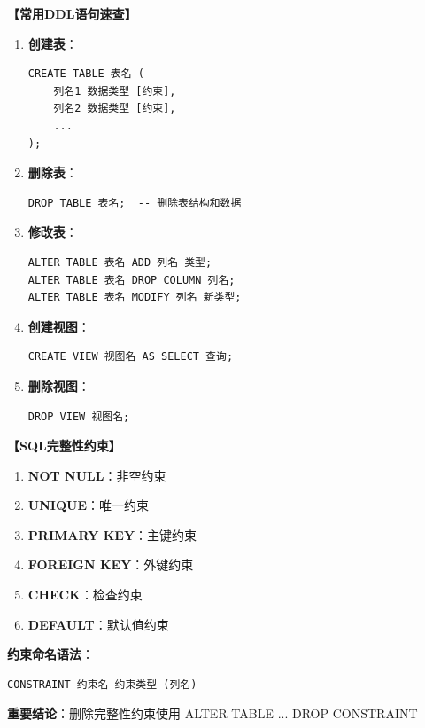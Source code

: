 \documentclass[12pt, a4paper]{article}
\newenvironment{bluebox}[1]{%
  \begin{trivlist}
  \item[\hskip\labelsep \textbf{#1}]
  \setlength{\parskip}{0.5ex}
  \setlength{\itemsep}{0.5ex}
}{%
  \end{trivlist}
}
\begin{document}
\begin{bluebox}{DDL语句}
	\textbf{【常用DDL语句速查】}

	\begin{enumerate}[leftmargin=*, label=\textbf{\arabic*.}]
		\item \textbf{创建表}：
		      \begin{verbatim}
CREATE TABLE 表名 (
    列名1 数据类型 [约束],
    列名2 数据类型 [约束],
    ...
);
		      \end{verbatim}
		\item \textbf{删除表}：
		      \begin{verbatim}
DROP TABLE 表名;  -- 删除表结构和数据
		      \end{verbatim}
		\item \textbf{修改表}：
		      \begin{verbatim}
ALTER TABLE 表名 ADD 列名 类型;
ALTER TABLE 表名 DROP COLUMN 列名;
ALTER TABLE 表名 MODIFY 列名 新类型;
		      \end{verbatim}
		\item \textbf{创建视图}：
		      \begin{verbatim}
CREATE VIEW 视图名 AS SELECT 查询;
		      \end{verbatim}
		\item \textbf{删除视图}：
		      \begin{verbatim}
DROP VIEW 视图名;
		      \end{verbatim}
	\end{enumerate}
\end{bluebox}

\begin{bluebox}{完整性约束}
	\textbf{【SQL完整性约束】}

	\begin{enumerate}[leftmargin=*, label=\textbf{\arabic*.}]
		\item \textbf{NOT NULL}：非空约束
		\item \textbf{UNIQUE}：唯一约束
		\item \textbf{PRIMARY KEY}：主键约束
		\item \textbf{FOREIGN KEY}：外键约束
		\item \textbf{CHECK}：检查约束
		\item \textbf{DEFAULT}：默认值约束
	\end{enumerate}

	\textbf{约束命名语法}：
	\begin{verbatim}
CONSTRAINT 约束名 约束类型 (列名)
	\end{verbatim}

	\textbf{重要结论}：删除完整性约束使用 ALTER TABLE ... DROP CONSTRAINT
\end{bluebox}
\end{document}
